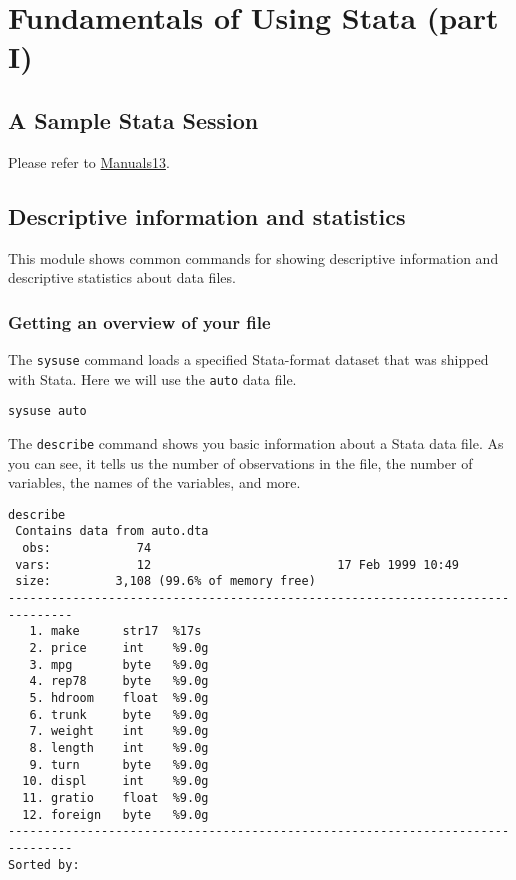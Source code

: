 \section{Fundamentals of Using Stata (part I)}

\subsection{A Sample Stata Session}
Please refer to \href{http://www.stata.com/manuals13/gsw1.pdf}{Manuals13}.

\subsection{Descriptive information and statistics}
This module shows common commands for showing descriptive information and descriptive statistics about data files.

\subsubsection{Getting an overview of your file}

The \lstinline{sysuse} command loads a specified Stata-format dataset that was shipped with Stata. Here we will use the \lstinline{auto} data file.

\begin{lstlisting}
sysuse auto
\end{lstlisting}

The \lstinline{describe} command shows you basic information about a Stata data file. As you can see, it tells us the number of observations in the file, the number of variables, the names of the variables, and more.

\begin{lstlisting}
describe
 Contains data from auto.dta
  obs:            74
 vars:            12                          17 Feb 1999 10:49
 size:         3,108 (99.6% of memory free)
-------------------------------------------------------------------------------
   1. make      str17  %17s
   2. price     int    %9.0g
   3. mpg       byte   %9.0g
   4. rep78     byte   %9.0g
   5. hdroom    float  %9.0g
   6. trunk     byte   %9.0g
   7. weight    int    %9.0g
   8. length    int    %9.0g
   9. turn      byte   %9.0g
  10. displ     int    %9.0g
  11. gratio    float  %9.0g
  12. foreign   byte   %9.0g
-------------------------------------------------------------------------------
Sorted by:
\end{lstlisting}

